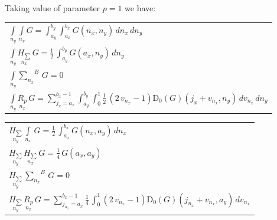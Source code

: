 \documentclass[11pt]{article}
\begin{document}
Taking value of parameter \(p = 1\) we have:

    \begin{center}
\begin{tabular}{ | l | }
\hline

$\int\limits_{n_y}^{} \int\limits_{n_x}^{} G = \int_{a_{y}}^{b_{y}} \int_{a_{x}}^{b_{x}} G\left(n_{x}, n_{y}\right)\,{d n_{x}}\,{d n_{y}}$ \\

$\int\limits_{n_y}^{} \underset{n_x}{H_{\sum}}\,G = \frac{1}{2} \, \int_{a_{y}}^{b_{y}} G\left(a_{x}, n_{y}\right)\,{d n_{y}}$ \\

$\int\limits_{n_y}^{} {\sum\limits_{n_x}^{}}^{B}\,G = 0$ \\

$\int\limits_{n_y}^{} \underset{n_x}{R_{p}}\,G = {\sum_{j_{x}=a_{x}}^{b_{x} - 1} \int_{a_{y}}^{b_{y}} \int_{0}^{1} \frac{1}{2} \, {\left(2 \, v_{n_{x}} - 1\right)} \mathrm{D}_{0}\left(G\right)\left(j_{x} + v_{n_{x}}, n_{y}\right)\,{d v_{n_{x}}}\,{d n_{y}}}$ \\

\hline

\end{tabular}
\end{center}

    \begin{center}
\begin{tabular}{ | l | }

\hline

$\underset{n_y}{H_{\sum}}\,\int\limits_{n_x}^{}\,G = \frac{1}{2} \, \int_{a_{x}}^{b_{x}} G\left(n_{x}, a_{y}\right)\,{d n_{x}}$ \\

$\underset{n_y}{H_{\sum}}\,\underset{n_x}{H_{\sum}}\,G = \frac{1}{4} \, G\left(a_{x}, a_{y}\right)$ \\

$\underset{n_y}{H_{\sum}}\,{\sum\limits_{n_x}^{}}^{B}\,G = 0$ \\

$\underset{n_y}{H_{\sum}}\,\underset{n_x}{R_{p}}\,G = {\sum_{j_{n_{x}}=a_{x}}^{b_{x} - 1} \frac{1}{4} \, \int_{0}^{1} \left(2 \, v_{n_{x}} - 1 \right) \mathrm{D}_{0}\left(G\right)\left(j_{n_{x}} + v_{n_{x}}, a_{y}\right)\,{d v_{n_{x}}} }$ \\

\hline

\end{tabular}
\end{center}
\end{document}
